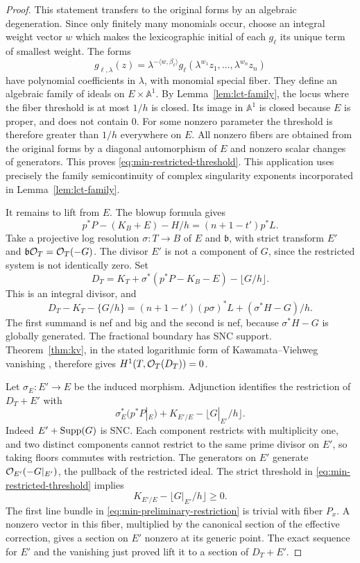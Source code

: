 \begin{proof}
This statement transfers to the original forms by an algebraic
degeneration. Since only finitely many monomials occur, choose an
integral weight vector $w$ which makes the lexicographic initial of
each $g_\ell$ its unique term of smallest weight. The forms
\[
 g_{\ell,\lambda}(z)
   =\lambda^{-\langle w,\beta_\ell\rangle}
      g_\ell(\lambda^{w_1}z_1,\ldots,\lambda^{w_n}z_n)
\]
have polynomial coefficients in $\lambda$, with monomial special
fiber. They define an algebraic family of ideals on
$E\times\mathbb A^1$. By Lemma~\ref{lem:lct-family}, the locus where
the fiber threshold is at most $1/h$ is closed. Its image in
$\mathbb A^1$ is closed because $E$ is proper, and does not contain
$0$. For some nonzero parameter the threshold is therefore greater
than $1/h$ everywhere on $E$. All nonzero fibers are obtained from the
original forms by a diagonal automorphism of $E$ and nonzero scalar
changes of generators. This proves
\eqref{eq:min-restricted-threshold}. This application uses precisely
the family semicontinuity of complex singularity exponents
\cite{dk2001} incorporated in Lemma~\ref{lem:lct-family}.

It remains to lift from $E$. The blowup formula gives
\begin{equation}
\label{eq:min-adjoint-identity}
 p^*P-(K_B+E)-H/h=(n+1-t')p^*L.
\end{equation}
Take a projective log resolution
$\sigma:T\longrightarrow B$ of $E$ and $\mathfrak b$, with strict
transform $E'$ and
$\mathfrak b\mathcal O_T=\mathcal O_T(-G)$. The divisor $E'$ is not a component
of $G$, since the restricted system is not identically zero. Set
\[
 D_T=K_T+\sigma^*(p^*P-K_B-E)-\lfloor G/h\rfloor.
\]
This is an integral divisor, and
\begin{equation}
\label{eq:min-preliminary-positivity}
 D_T-K_T-\{G/h\}
 =(n+1-t')(p\sigma)^*L+(\sigma^*H-G)/h.
\end{equation}
The first summand is nef and big and the second is nef, because
$\sigma^*H-G$ is globally generated. The fractional boundary has SNC
support. Theorem~\ref{thm:kv}, in the stated logarithmic form of
Kawamata--Viehweg vanishing \cite{fujinoKV}, therefore gives
$H^1(T,\mathcal O_T(D_T))=0$.

Let $\sigma_E:E'\longrightarrow E$ be the induced morphism. Adjunction
identifies the restriction of $D_T+E'$ with
\begin{equation}
\label{eq:min-preliminary-restriction}
 \sigma_E^*(p^*P|_E)
   +K_{E'/E}-\lfloor G|_{E'}/h\rfloor.
\end{equation}
Indeed $E'+\operatorname{Supp}(G)$ is SNC. Each component restricts with
multiplicity one, and two distinct components cannot restrict to the
same prime divisor on $E'$, so taking floors commutes with restriction.
The generators on $E'$ generate $\mathcal O_{E'}(-G|_{E'})$, the pullback
of the restricted ideal. The strict threshold in
\eqref{eq:min-restricted-threshold} implies
\[
 K_{E'/E}-\lfloor G|_{E'}/h\rfloor\geq0.
\]
The first line bundle in \eqref{eq:min-preliminary-restriction} is
trivial with fiber $P_x$. A nonzero vector in this fiber, multiplied
by the canonical section of the effective correction, gives a section
on $E'$ nonzero at its generic point. The exact sequence for $E'$ and
the vanishing just proved lift it to a section of $D_T+E'$.


\end{proof}
